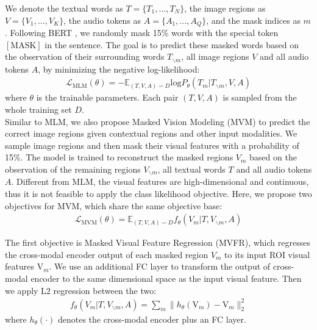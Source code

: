 \documentclass[10pt,twocolumn,letterpaper]{article}
\begin{document}
 We denote the textual words as $T = \{T_1,...,T_N\}$, the image regions as $V = \{V_1,...,V_K\}$, the audio tokens as $A=\{A_1,...,A_Q\}$, and the mask indices as $m$. Following BERT \cite{bert}, we randomly mask 15\% words with the special token $[\mathrm{MASK}]$ in the sentence. The goal is to predict these masked words based on the observation of their surrounding words $T_{\backslash m}$, all image regions $V$ and all audio tokens $A$, by minimizing the negative log-likelihood:
\begin{align}
\mathcal{L}_{\mathrm{MLM}}(\theta) = - \mathbb{E}_{(T,V,A)\backsim D} \mathrm{log}P_\theta (T_m | T_{\backslash m}, V, A)
\end{align}  
where $\theta$ is the trainable parameters. Each pair $(T,V,A)$ is sampled from the whole training set $D$.  \\

 Similar to MLM, we also propose Masked Vision Modeling (MVM) to predict the correct image regions given contextual regions and other input modalities. We sample image regions and then mask their visual features with a probability of 15\%. The model is trained to reconstruct the masked regions $V_m$ based on the observation of the remaining regions $V_{\backslash m}$, all textual words $T$ and all audio tokens $A$. Different from MLM, the visual features are high-dimensional and continuous, thus it is not feasible to apply the class likelihood objective. Here, we propose two objectives for MVM, which share the same objective base:
\begin{align}
\mathcal{L}_{\mathrm{MVM}}(\theta) = \mathbb{E}_{(T,V,A)\backsim D} f_{\theta}(V_m|T, V_{\backslash m},A)
\end{align}  

The first objective is Masked Visual Feature Regression (MVFR), which regresses the cross-modal encoder output of each masked region $V_m$ to its input ROI visual features $\boldsymbol{\mathrm{V}}_m$. We use an additional FC layer to transform the output of cross-modal encoder to the same dimensional space as the input visual feature. Then we apply L2 regression between the two: 
\begin{align}
f_{\theta}(V_m|T, V_{\backslash m},A) = \sum_m \| h_{\theta}(\boldsymbol{\mathrm{V}}_m) - \boldsymbol{\mathrm{V}}_m\|^2_2
\end{align}
where $h_{\theta}(\cdot)$ denotes the cross-modal encoder plus an FC layer.
\end{document}
